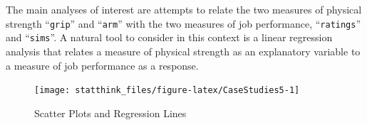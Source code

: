 \documentclass[]{krantz}
\makeatletter
\newenvironment{Shaded}{\begin{snugshade}}{\end{snugshade}}
\newcommand{\CommentTok}[1]{\textcolor[rgb]{0.56,0.35,0.01}{\textit{#1}}}
\newcommand{\DataTypeTok}[1]{\textcolor[rgb]{0.13,0.29,0.53}{#1}}
\newcommand{\DecValTok}[1]{\textcolor[rgb]{0.00,0.00,0.81}{#1}}
\newcommand{\FloatTok}[1]{\textcolor[rgb]{0.00,0.00,0.81}{#1}}
\newcommand{\KeywordTok}[1]{\textcolor[rgb]{0.13,0.29,0.53}{\textbf{#1}}}
\newcommand{\NormalTok}[1]{#1}
\newcommand{\OperatorTok}[1]{\textcolor[rgb]{0.81,0.36,0.00}{\textbf{#1}}}
\newcommand{\StringTok}[1]{\textcolor[rgb]{0.31,0.60,0.02}{#1}}
\newenvironment{kframe}{%
\medskip{}
\setlength{\fboxsep}{.8em}
 \def\at@end@of@kframe{}%
 \ifinner\ifhmode%
  \def\at@end@of@kframe{\end{minipage}}%
  \begin{minipage}{\columnwidth}%
 \fi\fi%
 \def\FrameCommand##1{\hskip\@totalleftmargin \hskip-\fboxsep
 \colorbox{shadecolor}{##1}\hskip-\fboxsep
     \hskip-\linewidth \hskip-\@totalleftmargin \hskip\columnwidth}%
 \MakeFramed {\advance\hsize-\width
   \@totalleftmargin\z@ \linewidth\hsize
   \@setminipage}}%
 {\par\unskip\endMakeFramed%
 \at@end@of@kframe}
\renewenvironment{Shaded}{\begin{kframe}}{\end{kframe}}
\theoremstyle{definition}
\theoremstyle{definition}
\theoremstyle{definition}
\theoremstyle{remark}
\makeatother
\begin{document}
The main analyses of interest are attempts to relate the two measures of
physical strength ``\texttt{grip}'' and ``\texttt{arm}'' with the two measures of job
performance, ``\texttt{ratings}'' and ``\texttt{sims}''. A natural tool to consider in
this context is a linear regression analysis that relates a measure of
physical strength as an explanatory variable to a measure of job
performance as a response.

\begin{Shaded}
\end{Shaded}

\begin{figure}

{\centering \texttt{[image: statthink\_files/figure-latex/CaseStudies5-1]} 

}

\caption{Scatter Plots and Regression Lines}\label{fig:CaseStudies5}
\end{figure}
\end{document}

